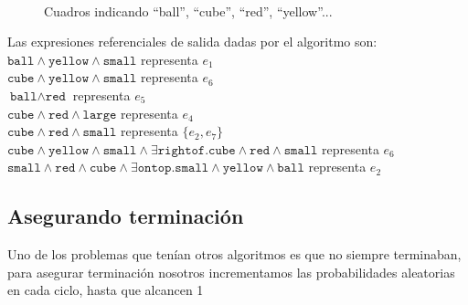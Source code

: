\begin{figure}[ht]
\begin{center}
\\[0pt]
\caption{Cuadros indicando ``ball'', ``cube'', ``red'', ``yellow''...}
\label{fig-modelo17}
\end{center}
\end{figure}

Las expresiones referenciales de salida dadas por el algoritmo son:\\

$\texttt{ball} \wedge \texttt{yellow} \wedge \texttt{small}$ representa $e_1$ \\
$\texttt{cube} \wedge \texttt{yellow} \wedge \texttt{small}$ representa $e_6$ \\
$\texttt{ball} \wedge \texttt{red}$ representa $e_5$ \\
$\texttt{cube} \wedge \texttt{red} \wedge \texttt{large}$ representa $e_4$ \\
$\texttt{cube} \wedge \texttt{red} \wedge \texttt{small}$ representa $\{e_2,e_7\}$  \\
$\texttt{cube} \wedge \texttt{yellow} \wedge \texttt{small} \wedge \exists \texttt{rightof}. \texttt{cube} \wedge \texttt{red} \wedge \texttt{small}$ representa $e_6$ \\
$\texttt{small} \wedge \texttt{red} \wedge \texttt{cube} \wedge \exists \texttt{ontop}. \texttt{small} \wedge \texttt{yellow} \wedge \texttt{ball}$ representa $e_2$ \\



\subsection{Asegurando terminaci\'on}

Uno de los problemas que ten\'ian otros algoritmos es que no siempre terminaban, para asegurar terminaci\'on nosotros incrementamos las probabilidades aleatorias en cada ciclo, hasta que alcancen 1

